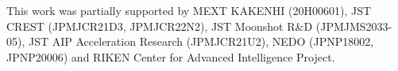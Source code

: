 This work was partially supported by MEXT KAKENHI (20H00601), JST CREST (JPMJCR21D3, JPMJCR22N2), JST Moonshot R\&D (JPMJMS2033-05), JST AIP Acceleration Research (JPMJCR21U2), NEDO (JPNP18002, JPNP20006) and RIKEN Center for Advanced Intelligence Project.
